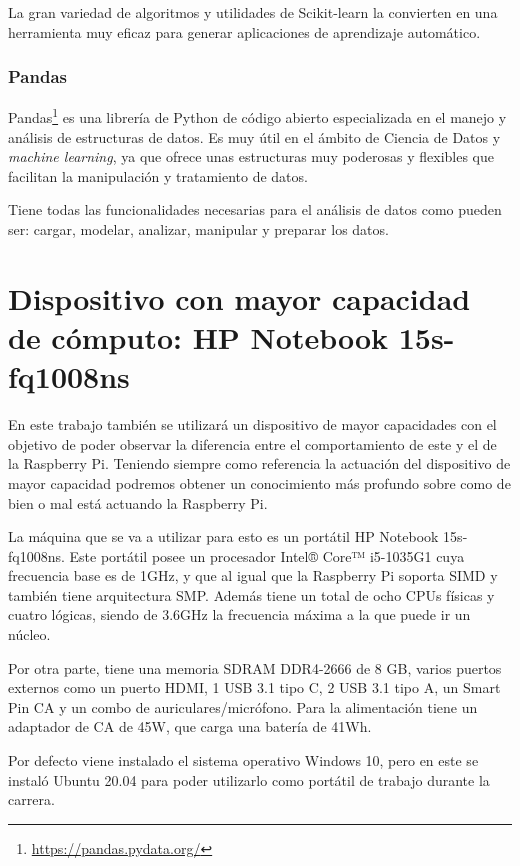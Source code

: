 \documentclass[a4paper, 12pt]{book}
\begin{document}
La gran variedad de algoritmos y utilidades de Scikit-learn la convierten en una herramienta muy eficaz para generar aplicaciones de aprendizaje automático.

\subsubsection{Pandas}
\label{subsubsec:Pandas}

Pandas\footnote{\url{https://pandas.pydata.org/}} es una librería de Python de código abierto especializada en el manejo y análisis de estructuras de datos. Es muy útil en el ámbito de Ciencia de Datos y \textit{machine learning}, ya que ofrece unas estructuras muy poderosas y flexibles que facilitan la manipulación y tratamiento de datos.

Tiene todas las funcionalidades necesarias para el análisis de datos como pueden ser: cargar, modelar, analizar, manipular y preparar los datos.


\section{Dispositivo con mayor capacidad de cómputo: HP Notebook 15s-fq1008ns}
\label{sec:portatil}

En este trabajo también se utilizará un dispositivo de mayor capacidades con el objetivo de poder observar la diferencia entre el comportamiento de este y el de la Raspberry Pi. Teniendo siempre como referencia la actuación del dispositivo de mayor capacidad podremos obtener un conocimiento más profundo sobre como de bien o mal está actuando la Raspberry Pi. 

La máquina que se va a utilizar para esto es un portátil HP Notebook 15s-fq1008ns. Este portátil posee un procesador Intel® Core™ i5-1035G1 cuya frecuencia base es de 1GHz, y que al igual que la Raspberry Pi soporta SIMD y también tiene arquitectura SMP. Además tiene un total de ocho CPUs físicas y cuatro lógicas, siendo de 3.6GHz la frecuencia máxima a la que puede ir un núcleo. 

Por otra parte, tiene una memoria SDRAM DDR4-2666 de 8 GB, varios puertos externos como un puerto HDMI, 1 USB 3.1 tipo C, 2 USB 3.1 tipo A, un Smart Pin CA y un combo de auriculares/micrófono. Para la alimentación tiene un adaptador de CA de 45W, que carga una batería de 41Wh. 

Por defecto viene instalado el sistema operativo Windows 10, pero en este se instaló Ubuntu 20.04 para poder utilizarlo como portátil de trabajo durante la carrera. 
\end{document}
